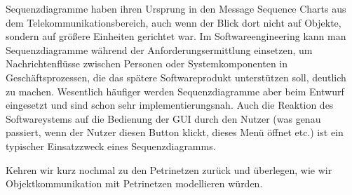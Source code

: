 Sequenzdiagramme haben ihren Ursprung in den Message Sequence Charts aus dem Telekommunikationsbereich, auch wenn der Blick dort nicht auf Objekte, sondern auf größere Einheiten gerichtet war. Im Softwareengineering kann man Sequenzdiagramme während der Anforderungsermittlung einsetzen, um Nachrichtenflüsse zwischen Personen oder Systemkomponenten in Geschäftsprozessen, die das spätere Softwareprodukt unterstützen soll, deutlich zu machen. Wesentlich häufiger werden Sequenzdiagramme aber beim Entwurf eingesetzt und sind schon sehr implementierungsnah. Auch die Reaktion des Softwareystems auf die Bedienung der GUI durch den Nutzer (was genau passiert, wenn der Nutzer diesen Button klickt, dieses Menü öffnet etc.) ist ein typischer Einsatzzweck eines Sequenzdiagramms.

Kehren wir kurz nochmal zu den Petrinetzen zurück und überlegen, wie wir Objektkommunikation mit Petrinetzen modellieren würden.

\pagebreak %

